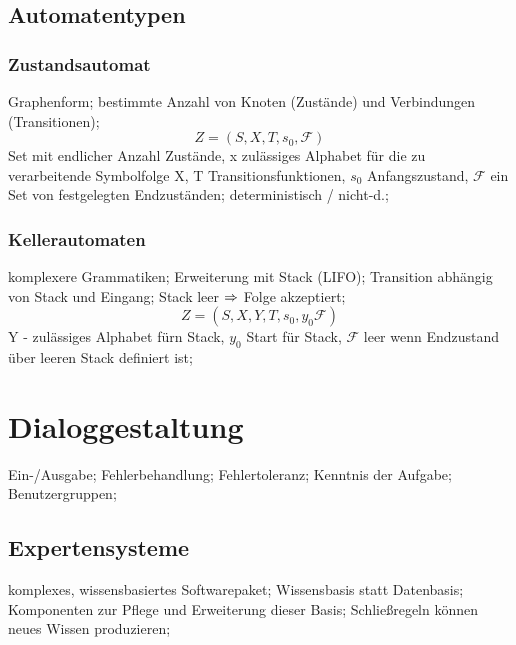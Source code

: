 \documentclass[german,color,6pt]{latex4ei/latex4ei_sheet}
\begin{document}
\subsection{Automatentypen}
\begin{sectionbox}
\subsubsection{Zustandsautomat}
Graphenform; bestimmte Anzahl von Knoten (Zustände) und Verbindungen (Transitionen);
\begin{equation*}
Z = (S, X, T, s_0, \mathcal F )
\end{equation*}
Set mit endlicher Anzahl Zustände, x zulässiges Alphabet für die zu verarbeitende Symbolfolge X, T Transitionsfunktionen, $s_0$ Anfangszustand, $\mathcal F$ ein Set von festgelegten Endzuständen; deterministisch / nicht-d.;
\end{sectionbox}

\begin{sectionbox}
\subsubsection{Kellerautomaten}
komplexere Grammatiken; Erweiterung mit Stack (LIFO); Transition abhängig von Stack und Eingang; Stack leer $\Rightarrow$ Folge akzeptiert;
\begin{equation*}
Z = (S, X, Y, T, s_0, y_0 \mathcal F )
\end{equation*}
Y - zulässiges Alphabet fürn Stack, $y_0$ Start für Stack, $\mathcal F$ leer wenn Endzustand über leeren Stack definiert ist;
\end{sectionbox}

\section{Dialoggestaltung}
\begin{symbolbox}
Ein-/Ausgabe; Fehlerbehandlung; Fehlertoleranz; Kenntnis der Aufgabe; Benutzergruppen;
\end{symbolbox}

\begin{sectionbox}
\subsection{Expertensysteme}
komplexes, wissensbasiertes Softwarepaket; Wissensbasis statt Datenbasis; Komponenten zur Pflege und Erweiterung dieser Basis; Schließregeln können neues Wissen produzieren;
\end{sectionbox}
\end{document}
